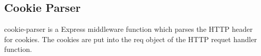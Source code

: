 \subsection{Cookie Parser}
cookie-parser is a Express middleware function which parses the HTTP header for cookies. The cookies are put into the req object of the HTTP requet handler function.